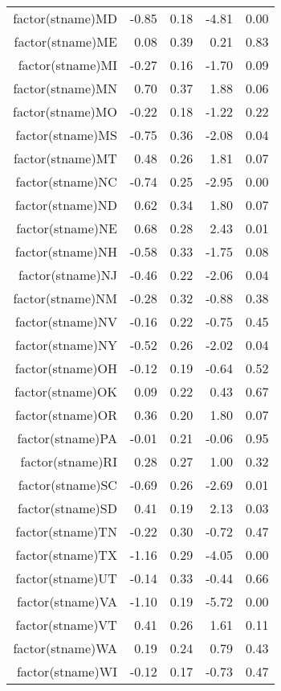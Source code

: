 \begin{table}[ht]
\begin{tabular}{rrrrr}
  factor(stname)MD & -0.85 & 0.18 & -4.81 & 0.00 \\ 
  factor(stname)ME & 0.08 & 0.39 & 0.21 & 0.83 \\ 
  factor(stname)MI & -0.27 & 0.16 & -1.70 & 0.09 \\ 
  factor(stname)MN & 0.70 & 0.37 & 1.88 & 0.06 \\ 
  factor(stname)MO & -0.22 & 0.18 & -1.22 & 0.22 \\ 
  factor(stname)MS & -0.75 & 0.36 & -2.08 & 0.04 \\ 
  factor(stname)MT & 0.48 & 0.26 & 1.81 & 0.07 \\ 
  factor(stname)NC & -0.74 & 0.25 & -2.95 & 0.00 \\ 
  factor(stname)ND & 0.62 & 0.34 & 1.80 & 0.07 \\ 
  factor(stname)NE & 0.68 & 0.28 & 2.43 & 0.01 \\ 
  factor(stname)NH & -0.58 & 0.33 & -1.75 & 0.08 \\ 
  factor(stname)NJ & -0.46 & 0.22 & -2.06 & 0.04 \\ 
  factor(stname)NM & -0.28 & 0.32 & -0.88 & 0.38 \\ 
  factor(stname)NV & -0.16 & 0.22 & -0.75 & 0.45 \\ 
  factor(stname)NY & -0.52 & 0.26 & -2.02 & 0.04 \\ 
  factor(stname)OH & -0.12 & 0.19 & -0.64 & 0.52 \\ 
  factor(stname)OK & 0.09 & 0.22 & 0.43 & 0.67 \\ 
  factor(stname)OR & 0.36 & 0.20 & 1.80 & 0.07 \\ 
  factor(stname)PA & -0.01 & 0.21 & -0.06 & 0.95 \\ 
  factor(stname)RI & 0.28 & 0.27 & 1.00 & 0.32 \\ 
  factor(stname)SC & -0.69 & 0.26 & -2.69 & 0.01 \\ 
  factor(stname)SD & 0.41 & 0.19 & 2.13 & 0.03 \\ 
  factor(stname)TN & -0.22 & 0.30 & -0.72 & 0.47 \\ 
  factor(stname)TX & -1.16 & 0.29 & -4.05 & 0.00 \\ 
  factor(stname)UT & -0.14 & 0.33 & -0.44 & 0.66 \\ 
  factor(stname)VA & -1.10 & 0.19 & -5.72 & 0.00 \\ 
  factor(stname)VT & 0.41 & 0.26 & 1.61 & 0.11 \\ 
  factor(stname)WA & 0.19 & 0.24 & 0.79 & 0.43 \\ 
  factor(stname)WI & -0.12 & 0.17 & -0.73 & 0.47 \\ 

\end{tabular}
\end{table}
